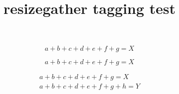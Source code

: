 \documentclass{article}
\title{resizegather tagging test}
\begin{document}
\begin{equation}
a+b+c+d+e+f+g = X
\end{equation}

\begin{displaymath}
a+b+c+d+e+f+g = X
\end{displaymath}

\begin{gather}
a+b+c+d+e+f+g = X \\
a+b+c+d+e+f+g+h = Y
\end{gather}
\end{document}
